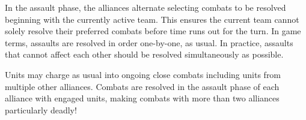 

In the assault phase, the alliances alternate selecting combats to be
resolved beginning with the currently active team.  This ensures the
current team cannot solely resolve their preferred combats before time
runs out for the turn.  In game terms, assaults are resolved in order
one-by-one, as usual. In practice, assaults that cannot affect each
other should be resolved simultaneously as possible.

Units may charge as usual into ongoing close combats including units
from multiple other alliances.  Combats are resolved in the assault
phase of each alliance with engaged units, making combats with more
than two alliances particularly deadly!
